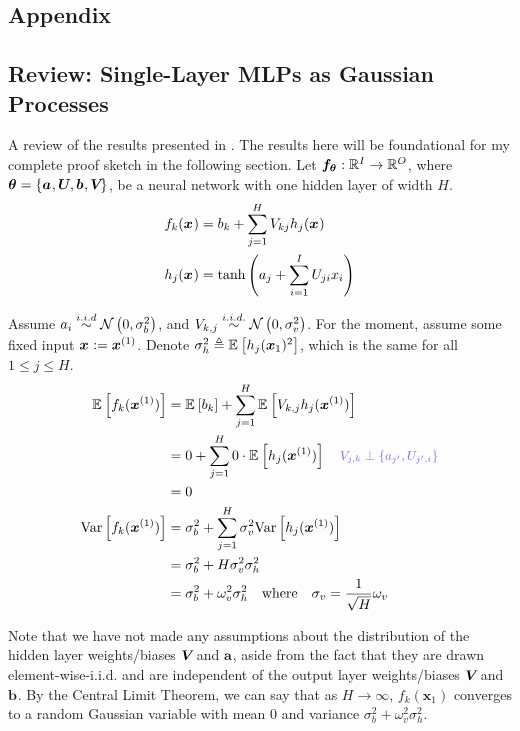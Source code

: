 \documentclass{article}
\renewcommand\vec[2][]{\bm{#2}_{#1}}
\begin{document}
\clearpage 


	
\clearpage 
\begin{appendices}
\section{Appendix}



\subsection{Review: Single-Layer MLPs as Gaussian Processes}

A review of the results presented in \cite{neal1996}. The results here will be foundational for my complete proof sketch in the following section. Let $\vec[\vec \theta]{f}: \R^{I} \to \R^{O}$, where $\vec\theta = \{ \vec a, \matr U, \vec b, \matr V \}$, be a neural network with one hidden layer of width $H$.
\begin{align}
	f_k(\vec x) 	
	&= b_k + \sum_{j = 1}^{H} V_{kj} h_j(\vec x) \\
	h_j(\vec x)
	&= \tanh\lr{ a_j + \sum_{i = 1}^{I} U_{ji} x_i }
\end{align}

Assume $a_i \overset{i.i.d}{\sim} \mathcal{N}\left( 0, \sigma_b^2 \right)$, and $V_{k,j} \overset{i.i.d.}{\sim} \mathcal{N}\left( 0, \sigma_v^2 \right)$. For the moment, assume some fixed input $\vec x := \ivec[1]{x}$. Denote $\sigma_h^2 \triangleq \E{h_j(\vec[1]{x})^2}$, which is the same for all $1 \leq j \leq H$.
\begin{align}
	\E{f_k(\ivec[1]{x})} 
	&= \E{b_k} + \sum_{j = 1}^{H} \E{V_{k,j} h_j(\ivec[1]{x})} \\ 
	&= 0 + \sum_{j = 1}^{H} 0 \cdot \E{h_j(\ivec[1]{x})} \quad \mblue{V_{j,k} \perp \{a_{j'}, U_{j', i}\}} \\
	&= 0 \\
	\Var{f_k(\ivec[1]{x})} 
	&= \sigma_b^2 + \sum_{j=1}^{H} \sigma_{v}^2 \Var{h_j(\ivec[1]{x})} \\
	&= \sigma_b^2 + H \sigma_v^2 \sigma_h^2 \\
	&= \sigma_b^2 + \omega_v^2 \sigma_h^2 \quad \text{where} \quad \sigma_v = \inv{\sqrt{H}} \omega_v
\end{align}

Note that we have not made any assumptions about the distribution of the hidden layer weights/biases $\bm{V}_{}$ and $\vec a$, aside from the fact that they are drawn element-wise-i.i.d. and are independent of the output layer weights/biases $\bm{V}_{}$ and $\vec b$. By the Central Limit Theorem, we can say that as $H \to \infty$,  $f_k(\vec[1]{x})$ converges to a random Gaussian variable with mean $0$ and variance $\sigma_b^2 + \omega_v^2 \sigma_h^2$. 


\end{appendices}
\end{document}
